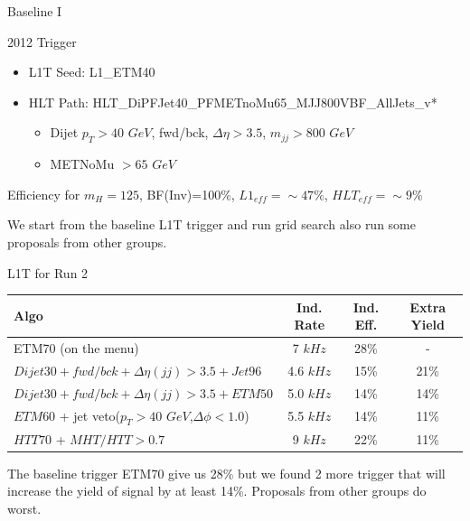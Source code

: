 \documentclass[8pt]{beamer}
\begin{document}
\begin{frame}{Baseline I}
 
\begin{block}{2012 Trigger}
 
\begin{itemize}
  \item L1T Seed: L1\_ETM40
  \item HLT Path: HLT\_DiPFJet40\_PFMETnoMu65\_MJJ800VBF\_AllJets\_v*
  \begin{itemize}
    \item Dijet $p_T>40$ $GeV$, fwd/bck, $\Delta\eta>3.5$, $m_{jj}>800$ $GeV$
    \item METNoMu $>65$ $GeV$
  \end{itemize}  
\end{itemize}
 
Efficiency for $m_{H}=125$, BF(Inv)=100\%, $L1_{eff}=\sim47\%$, $HLT_{eff}=\sim9\%$
 
\end{block}

We start from the baseline L1T trigger and run grid search also run some proposals from other groups.

\begin{block}{L1T for Run 2}
 
\centering
\begin{tabular}{|l|c|c|c|}
\hline
Algo & Ind. Rate & Ind. Eff. & Extra Yield \\
\hline\hline
ETM70 (on the menu) & 7 $kHz$ & 28\% & - \\
\hline\hline
$Dijet30 + fwd/bck + \Delta\eta(jj)>3.5 + Jet96$ & 4.6 $kHz$ & 15\% & 21\% \\
$Dijet30 + fwd/bck + \Delta\eta(jj)>3.5 + ETM50$ & 5.0 $kHz$ & 14\% & 14\% \\
\hline\hline
$ETM60$ + jet veto($p_T>40$ $GeV$,$\Delta\phi<1.0$) & 5.5 $kHz$ & 14\% & 11\% \\
$HTT70$ + $MHT/HTT>0.7$ & 9 $kHz$ & 22\% & 11\% \\
\hline
\end{tabular}
 
\end{block}

The baseline trigger ETM70 give us 28\% but we found 2 more trigger that will increase the yield of signal by at least 14\%. Proposals from other groups do worst.

\end{frame}
\end{document}
